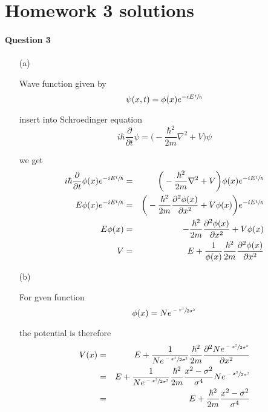 \documentclass[11pt,a4paper]{article}
\author{Zehao Gao}
\begin{document}
\section*{Homework 3 solutions}

\paragraph*{Question 3}

\begin{enumerate}

\item[(a)]

    Wave function given by
    \begin{equation}
        \psi(x,t)=\phi(x)e^{-iE\sfrac{t}{\hbar}}
    \end{equation}

    insert into Schroedinger equation
    \begin{equation}
        i\hbar\frac{\partial}{\partial t}\psi=\bigg(-\frac{\hbar^2}{2m}\nabla^2+V\bigg)\psi
    \end{equation}

    we get 
    \begin{eqnarray}
            i\hbar\frac{\partial}{\partial t}\phi(x)e^{-iE\sfrac{t}{\hbar}}
            &=&\bigg(-\frac{\hbar^2}{2m}\nabla^2+V\bigg)\phi(x)e^{-iE\sfrac{t}{\hbar}}\\
            E\phi(x)e^{-iE\sfrac{t}{\hbar}}
            &=&\bigg(-\frac{\hbar^2}{2m}\frac{\partial^2\phi(x)}{\partial x^2}+V\phi(x)\bigg)e^{-iE\sfrac{t}{\hbar}}\\
            E\phi(x)
            &=&-\frac{\hbar^2}{2m}\frac{\partial^2\phi(x)}{\partial x^2}+V\phi(x)\\
            V
            &=&E+\frac{1}{\phi(x)}\frac{\hbar^2}{2m}\frac{\partial^2\phi(x)}{\partial x^2}
    \end{eqnarray}

\item[(b)]

    For gven function
    \begin{equation}
        \phi(x)=Ne^{\sfrac{-x^2}{2\sigma^2}}
    \end{equation}

    the potential is therefore
    \begin{eqnarray}
        V(x)
        &=&E+\frac{1}{Ne^{\sfrac{-x^2}{2\sigma^2}}}\frac{\hbar^2}{2m}\frac{\partial^2Ne^{\sfrac{-x^2}{2\sigma^2}}}{\partial x^2}\\
        &=&E+\frac{1}{Ne^{\sfrac{-x^2}{2\sigma^2}}}\frac{\hbar^2}{2m}\frac{x^2-\sigma^2}{\sigma^4}Ne^{\sfrac{-x^2}{2\sigma^2}}\\
        &=&E+\frac{\hbar^2}{2m}\frac{x^2-\sigma^2}{\sigma^4}
    \end{eqnarray}


\end{enumerate}
\end{document}
